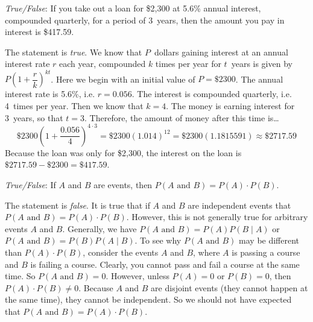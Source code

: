\documentclass[11pt,letterpaper]{article}
\begin{document}
\quizsol \textit{True/False}: If you take out a loan for \$2,300 at 5.6\% annual interest, compounded quarterly, for a period of 3~years, then the amount you pay in interest is \$417.59. \pspace

\sol The statement is \textit{true}. We know that $P$~dollars gaining interest at an annual interest rate $r$ each year, compounded $k$ times per year for $t$~years is given by $P \left(1 + \dfrac{r}{k} \right)^{kt}$. Here we begin with an initial value of $P= \$2300$. The annual interest rate is 5.6\%, i.e. $r= 0.056$. The interest is compounded quarterly, i.e. 4~times per year. Then we know that $k= 4$. The money is earning interest for 3~years, so that $t= 3$. Therefore, the amount of money after this time is\dots
	\[
	\$2300 \left(1 + \dfrac{0.056}{4} \right)^{4 \cdot 3}= \$2300 \left(1.014 \right)^{12}= \$2300(1.1815591) \approx \$2717.59
	\]
Because the loan was only for \$2,300, the interest on the loan is $\$2717.59 - \$2300= \$417.59$. \pvspace{1.5cm}



\quizsol \textit{True/False}: If $A$ and $B$ are events, then $P(A \text{ and } B)= P(A) \cdot P(B)$. \pspace

\sol The statement is \textit{false}. It is true that if $A$ and $B$ are independent events that $P(A \text{ and } B)= P(A) \cdot P(B)$. However, this is not generally true for arbitrary events $A$ and $B$. Generally, we have $P(A \text{ and } B)= P(A) P(B \;|\; A)$ or $P(A \text{ and } B)= P(B) P(A \;|\; B)$. To see why $P(A \text{ and } B)$ may be different than $P(A) \cdot P(B)$, consider the events $A$ and $B$, where $A$ is passing a course and $B$ is failing a course. Clearly, you cannot pass and fail a course at the same time. So $P(A \text{ and } B)= 0$. However, unless $P(A)= 0$ or $P(B)= 0$, then $P(A) \cdot P(B) \neq 0$. Because $A$ and $B$ are disjoint events (they cannot happen at the same time), they cannot be independent. So we should not have expected that $P(A \text{ and } B)= P(A) \cdot P(B)$.  
\end{document}
